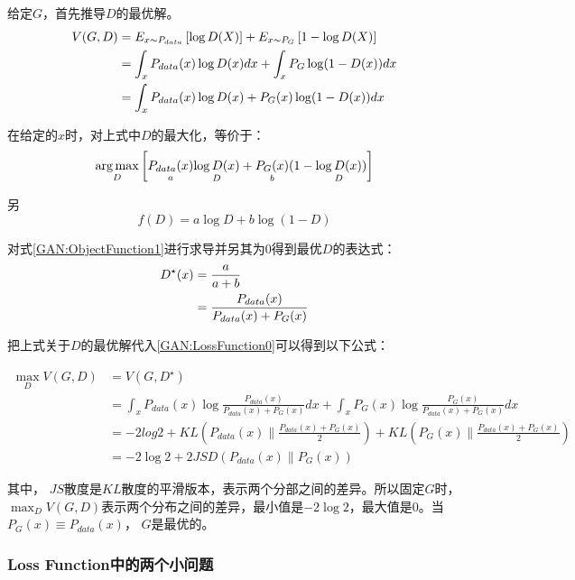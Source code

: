 给定$G$，首先推导$D$的最优解。
\begin{align}
V(G, D) & = E_{x \sim P_{data}}\left[ \log D(X) \right] + E_{x \sim P_{G}}\left[ 1-\log D(X) \right] \notag \\
        & = \int_{x}P_{data}(x) \log D(x) dx + \int_x P_G \log (1-D(x)) dx \notag \\
        & = \int_x P_{data}(x) \log D(x) + P_G(x) \log(1-D(x)) dx \notag \\
\end{align}

在给定的$x$时，对上式中$D$的最大化，等价于：
\begin{displaymath}
\operatorname*{arg\,max}_D \left[ \underset{a}{P_{data}(x)} \underset{D}{ \log D(x)} + \underset{b}{P_G(x)}(1 - \underset{D}{ \log D(x)}) \right]
\end{displaymath}

另
\begin{equation}
\label{GAN:ObjectFunction1}
f(D) = a \log D + b \log (1-D)
\end{equation}

对式\ref{GAN:ObjectFunction1}进行求导并另其为0得到最优$D$的表达式：
\begin{align}
D^{\star}(x) & = \frac{a}{a + b}   \notag \\
          & = \frac{P_{data}(x)}{P_{data}(x) + P_G(x)} \notag 
\end{align}

把上式关于$D$的最优解代入\ref{GAN:LossFunction0}可以得到以下公式：

\begin{align*}
\max_D V(G, D) & = V(G, D^{\star})    \\
               & = \int_{x}P_{data}(x) \log \frac{P_{data}(x)}{P_{data}(x) + P_G(x)} dx + \int_x P_G(x) \log  \frac{P_{G}(x)}{P_{data}(x) + P_G(x)} dx \\
               & = -2log2 + KL(P_{data}(x) \parallel \frac{P_{data}(x) + P_G(x)}{2}) + KL(P_{G}(x) \parallel \frac{P_{data}(x) + P_G(x)}{2}) \\
               & = -2 \log 2+ 2 JSD(P_{data}(x) \parallel P_G(x))
\end{align*}

其中， $JS$散度是$KL$散度的平滑版本，表示两个分部之间的差异。所以固定$G$时，$\max_D V(G, D)$表示两个分布之间的差异，最小值是$-2\log 2$，最大值是$0$。当$P_G(x) \equiv P_{data}(x)$， $G$是最优的。

\subsubsection{Loss Function中的两个小问题}


